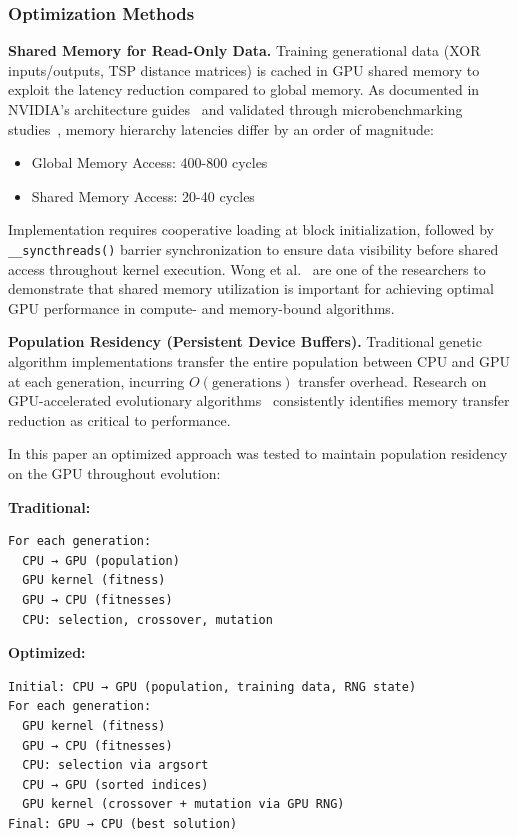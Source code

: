 \documentclass[a4paper,14pt]{extarticle}
\begin{document}
\subsubsection*{Optimization Methods}

\textbf{Shared Memory for Read-Only Data.} Training generational data (XOR inputs/outputs, TSP distance matrices) is cached in GPU shared memory to exploit the latency reduction compared to global memory. As documented in NVIDIA's architecture guides~\cite{nvidia2011cuda} and validated through microbenchmarking studies~\cite{wong2010demystifying}, memory hierarchy latencies differ by an order of magnitude:

\begin{itemize}
\item Global Memory Access: 400-800 cycles
\item Shared Memory Access: 20-40 cycles
\end{itemize}

Implementation requires cooperative loading at block initialization, followed by \texttt{\_\_syncthreads()} barrier synchronization to ensure data visibility before shared access throughout kernel execution. Wong et al.~\cite{wong2012cuda} are one of the researchers to demonstrate that shared memory utilization is important for achieving optimal GPU performance in compute- and memory-bound algorithms.     

\textbf{Population Residency (Persistent Device Buffers).} Traditional genetic algorithm implementations transfer the entire population between CPU and GPU at each generation, incurring $O(\text{generations})$ transfer overhead. Research on GPU-accelerated evolutionary algorithms~\cite{li2018accelerating,luong2013gpu} consistently identifies memory transfer reduction as critical to performance.

In this paper an optimized approach was tested to maintain population residency on the GPU throughout evolution:

\textbf{Traditional:}
\begin{verbatim}
For each generation:
  CPU → GPU (population)
  GPU kernel (fitness)
  GPU → CPU (fitnesses)
  CPU: selection, crossover, mutation
\end{verbatim}

\textbf{Optimized:}
\begin{verbatim}
Initial: CPU → GPU (population, training data, RNG state)
For each generation:
  GPU kernel (fitness)
  GPU → CPU (fitnesses)
  CPU: selection via argsort
  CPU → GPU (sorted indices)
  GPU kernel (crossover + mutation via GPU RNG)
Final: GPU → CPU (best solution)
\end{verbatim}
\end{document}
